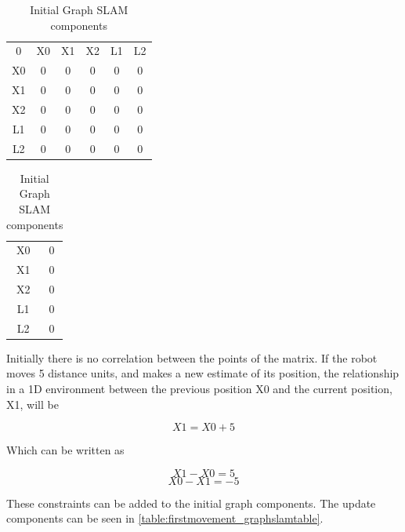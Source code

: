 \documentclass[Main]{subfiles}
\begin{document}
\begin{table}[H]
	\begin{subtable}{0.5\linewidth}
		\centering
	\begin{tabular}{cccccc}
		0 & X0 & X1 & X2 & L1 & L2 \\ 
		X0 & 0 & 0 & 0 & 0 & 0  \\ 
		X1 & 0 & 0 & 0 & 0 & 0  \\ 
		X2 & 0 & 0 & 0 & 0 & 0  \\  
		L1 & 0 & 0 & 0 & 0 & 0  \\ 
		L2 & 0 & 0 & 0 & 0 & 0  \\ 
	\end{tabular}
	\caption{$\Omega$ }
	\label{table:omegaone} 
	\end{subtable}
	\begin{subtable}{0.5\linewidth}
		\centering
		\begin{tabular}{cc}
			X0 & 0 \\ 
			X1 & 0 \\ 
			X2 & 0 \\ 
			L1 & 0 \\  
			L2 & 0 \\ 
		\end{tabular}
	\caption{$\xi$}
	\label{table:xione} 
	\end{subtable}
\caption{Initial Graph SLAM components}
\label{table:initialgraphslamtable} 
\end{table} \noindent

Initially there is no correlation between the points of the matrix.
If the robot moves 5 distance units, and makes a new estimate of its position, the relationship in a 1D environment between the previous position X0 and the current position, X1, will be

	\begin{equation}
		X1 = X0 + 5
	\end{equation}
	
Which can be written as

	\begin{equation}
		X1 - X0 = 5
	\end{equation}
	\begin{equation}
		X0 - X1 = -5
	\end{equation}
	
These constraints can be added to the initial graph components. The update components can be seen in \autoref{table:firstmovement_graphslamtable}. 
\end{document}
